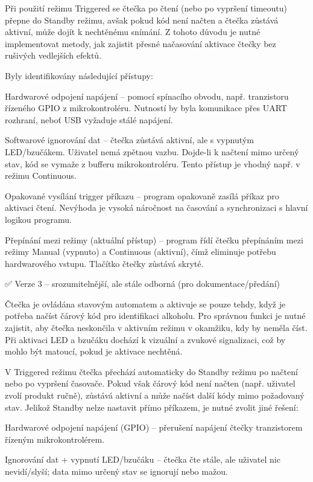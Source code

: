     Při použití režimu Triggered se čtečka po čtení (nebo po vypršení timeoutu) přepne do Standby režimu, avšak pokud kód není načten a čtečka zůstává aktivní, může dojít k nechtěnému snímání. Z tohoto důvodu je nutné implementovat metody, jak zajistit přesné načasování aktivace čtečky bez rušivých vedlejších efektů.

    Byly identifikovány následující přístupy:

        Hardwarové odpojení napájení – pomocí spínacího obvodu, např. tranzistoru řízeného GPIO z mikrokontroléru. Nutností by byla komunikace přes UART rozhraní, neboť USB vyžaduje stálé napájení.

        Softwarové ignorování dat – čtečka zůstává aktivní, ale s vypnutým LED/bzučákem. Uživatel nemá zpětnou vazbu. Dojde-li k načtení mimo určený stav, kód se vymaže z bufferu mikrokontroléru. Tento přístup je vhodný např. v režimu Continuous.

        Opakované vysílání trigger příkazu – program opakovaně zasílá příkaz pro aktivaci čtení. Nevýhoda je vysoká náročnost na časování a synchronizaci s hlavní logikou programu.

        Přepínání mezi režimy (aktuální přístup) – program řídí čtečku přepínáním mezi režimy Manual (vypnuto) a Continuous (aktivní), čímž eliminuje potřebu hardwarového vstupu. Tlačítko čtečky zůstává skryté.

✅ Verze 3 – srozumitelnější, ale stále odborná (pro dokumentace/předání)

    Čtečka je ovládána stavovým automatem a aktivuje se pouze tehdy, když je potřeba načíst čárový kód pro identifikaci alkoholu. Pro správnou funkci je nutné zajistit, aby čtečka neskončila v aktivním režimu v okamžiku, kdy by neměla číst. Při aktivaci LED a bzučáku dochází k vizuální a zvukové signalizaci, což by mohlo být matoucí, pokud je aktivace nechtěná.

    V Triggered režimu čtečka přechází automaticky do Standby režimu po načtení nebo po vypršení časovače. Pokud však čárový kód není načten (např. uživatel zvolí produkt ručně), zůstává aktivní a může načíst další kódy mimo požadovaný stav. Jelikož Standby nelze nastavit přímo příkazem, je nutné zvolit jiné řešení:

        Hardwarové odpojení napájení (GPIO) – přerušení napájení čtečky tranzistorem řízeným mikrokontrolérem.

        Ignorování dat + vypnutí LED/bzučáku – čtečka čte stále, ale uživatel nic nevidí/slyší; data mimo určený stav se ignorují nebo mažou.

